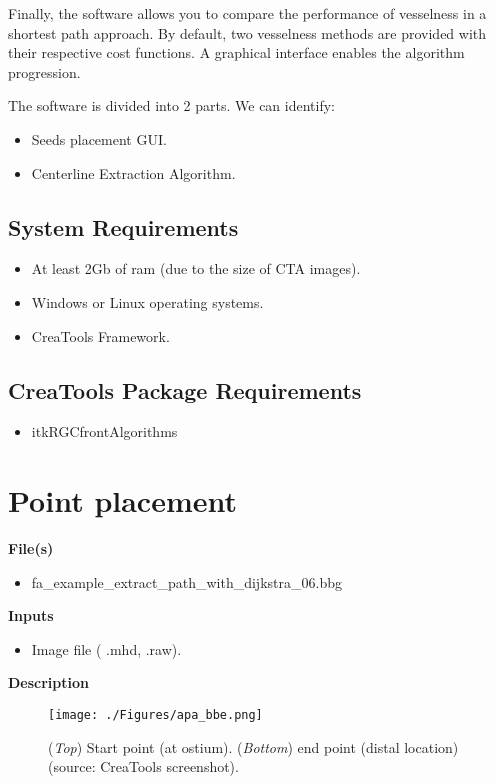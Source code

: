 Finally, the software allows you to compare the performance of vesselness in a shortest path approach. By default, two vesselness methods are provided \citep{Tek2008,Lesage2009a} with their respective cost functions. A graphical interface enables the algorithm progression.

The software is divided into 2 parts. We can identify:
\begin{itemize}
\item Seeds placement GUI.
\item Centerline Extraction Algorithm.
\end{itemize}

\subsection{System Requirements}

\begin{itemize}
\item At least 2Gb of ram (due to the size of CTA images).
\item Windows or Linux operating systems.
\item CreaTools Framework.
\end{itemize}

\subsection{CreaTools Package Requirements}

\begin{itemize}
\item itkRGC\/frontAlgorithms
\end{itemize}

\section{Point placement}

\textbf{File(s)}
\begin{itemize}
\item fa\_example\_extract\_path\_with\_dijkstra\_06.bbg
\end{itemize}

\textbf{Inputs}
\begin{itemize}
\item Image file (\* .mhd, \* .raw).
\end{itemize}

\textbf{Description}

\begin{figure}[ht]
	\centering
		\texttt{[image: ./Figures/apa\_bbe.png]}
	\caption[Radiologist's GUI]{(\textit{Top}) Start point (at ostium). (\textit{Bottom}) end point (distal location) (source: CreaTools screenshot).}
	\label{fig:apa_bbe}
\end{figure}

